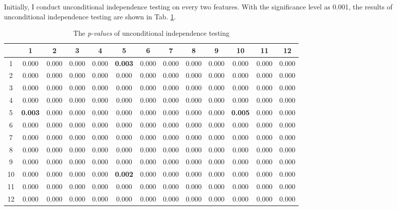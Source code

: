 \documentclass[12pt,a4paper]{article}
\theoremstyle{definition}
\begin{document}
Initially, I conduct unconditional independence testing on every two features. With the significance level as 0.001, the results of unconditional independence testing are shown in Tab. \ref{tab:uncon-in}.

\begin{table}[H]
	\renewcommand\arraystretch{1.35}
	\caption{The \textit{p-values} of unconditional independence testing}
	\label{tab:uncon-in}
	\centering
	
	\begin{tabular}{c|c|c|c|c|c|c|c|c|c|c|c|c}
		\centering
		\diagbox{id}{$p$}{id} & 1 & 2 & 3 & 4 & 5 & 6 & 7 & 8 & 9 & 10 & 11 & 12 \\
		\hline
		1 & 0.000 & 0.000 & 0.000 & 0.000 & \textbf{0.003} & 0.000 & 0.000 & 0.000 & 0.000 & 0.000 & 0.000 & 0.000 \\
		\hline
		2 & 0.000 & 0.000 & 0.000 & 0.000 & 0.000 & 0.000 & 0.000 & 0.000 & 0.000 & 0.000 & 0.000 & 0.000 \\
		\hline
		3 & 0.000 & 0.000 & 0.000 & 0.000 & 0.000 & 0.000 & 0.000 & 0.000 & 0.000 & 0.000 & 0.000 & 0.000 \\
		\hline
		4 & 0.000 & 0.000 & 0.000 & 0.000 & 0.000 & 0.000 & 0.000 & 0.000 & 0.000 & 0.000 & 0.000 & 0.000 \\
		\hline
		5 & \textbf{0.003} & 0.000 & 0.000 & 0.000 & 0.000 & 0.000 & 0.000 & 0.000 & 0.000 & \textbf{0.005} & 0.000 & 0.000 \\
		\hline
		6 & 0.000 & 0.000 & 0.000 & 0.000 & 0.000 & 0.000 & 0.000 & 0.000 & 0.000 & 0.000 & 0.000 & 0.000 \\
		\hline
		7 & 0.000 & 0.000 & 0.000 & 0.000 & 0.000 & 0.000 & 0.000 & 0.000 & 0.000 & 0.000 & 0.000 & 0.000 \\
		\hline
		8 & 0.000 & 0.000 & 0.000 & 0.000 & 0.000 & 0.000 & 0.000 & 0.000 & 0.000 & 0.000 & 0.000 & 0.000 \\
		\hline
		9 & 0.000 & 0.000 & 0.000 & 0.000 & 0.000 & 0.000 & 0.000 & 0.000 & 0.000 & 0.000 & 0.000 & 0.000 \\
		\hline
		10 & 0.000 & 0.000 & 0.000 & 0.000 & \textbf{0.002} & 0.000 & 0.000 & 0.000 & 0.000 & 0.000 & 0.000 & 0.000 \\
		\hline
		11 & 0.000 & 0.000 & 0.000 & 0.000 & 0.000 & 0.000 & 0.000 & 0.000 & 0.000 & 0.000 & 0.000 & 0.000 \\
		\hline
		12 & 0.000 & 0.000 & 0.000 & 0.000 & 0.000 & 0.000 & 0.000 & 0.000 & 0.000 & 0.000 & 0.000 & 0.000 \\
	\end{tabular}
\end{table}
\end{document}
